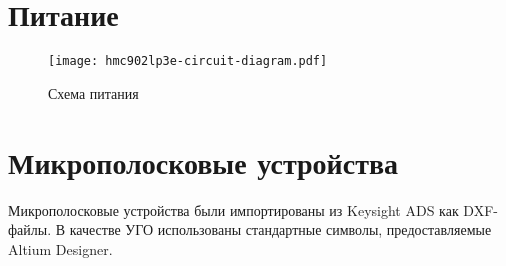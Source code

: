\section{Питание}

\begin{figure}[H]
    \centering
    \texttt{[image: hmc902lp3e-circuit-diagram.pdf]}
    \caption{Схема питания}%
    \label{fig:hmc902lp3e-circuit-diagram}
\end{figure}

\section{Микрополосковые устройства}

Микрополосковые устройства были импортированы из Keysight ADS как DXF-файлы.
В качестве УГО использованы стандартные символы, предоставляемые Altium Designer.
